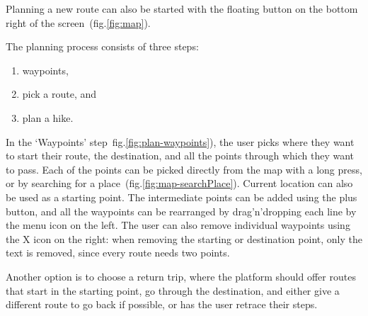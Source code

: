 Planning a new route can also be started with the floating button on the bottom right of the screen~(fig.\ref{fig:map}).

The planning process consists of three steps:
\begin{enumerate}
    \item waypoints,
    \item pick a route, and
    \item plan a hike.
\end{enumerate}

In the `Waypoints' step~fig.\ref{fig:plan-waypoints}), the user picks where they want to start their route, the destination, and all the points through which they want to pass.
Each of the points can be picked directly from the map with a long press, or by searching for a place~(fig.\ref{fig:map-searchPlace}).
Current location can also be used as a starting point.
The intermediate points can be added using the plus button, and all the waypoints can be rearranged by drag'n'dropping each line by the menu icon on the left.
The user can also remove individual waypoints using the X icon on the right: when removing the starting or destination point, only the text is removed, since every route needs two points.

Another option is to choose a return trip, where the platform should offer routes that start in the starting point, go through the destination, and either give a different route to go back if possible, or has the user retrace their steps.

